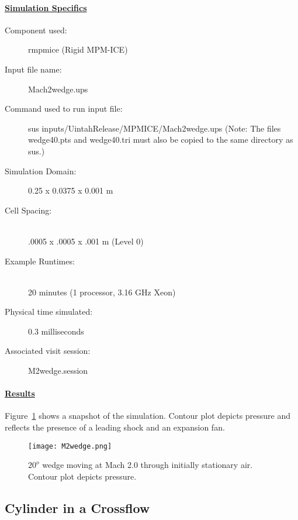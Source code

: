 \paragraph*{\underline{Simulation Specifics}}
\begin{description}
\item [Component used:] \hfill rmpmice (Rigid MPM-ICE)
\item [Input file name:] \hfill Mach2wedge.ups
\item [Command used to run input file:]\hfill sus inputs/UintahRelease/MPMICE/Mach2wedge.ups
(Note: The files wedge40.pts and wedge40.tri must also be copied to
the same directory as sus.)

\item [Simulation Domain:]\hfill    0.25 x 0.0375 x 0.001 m

\item [Cell Spacing:]\hfill \\
.0005 x .0005 x .001 m (Level 0)

\item [Example Runtimes:] \hfill \\
 20 minutes   (1 processor, 3.16 GHz Xeon)\\

\item [Physical time simulated:] \hfill 0.3 milliseconds

\item [Associated visit session:] \hfill M2wedge.session

\end{description}

\newpage

\paragraph*{\underline{Results}}

Figure~\ref{figwedge} shows a snapshot of the simulation.  Contour
plot depicts pressure and reflects the presence of a leading shock
and an expansion fan.
\begin{figure}
  \center
  \texttt{[image: M2wedge.png]}

  \caption{$20^o$ wedge moving at Mach 2.0 through initially stationary
air.  Contour plot depicts pressure.}
  \label{figwedge}
\end{figure}
\newpage
%
\subsection*{\center Cylinder in a Crossflow}
